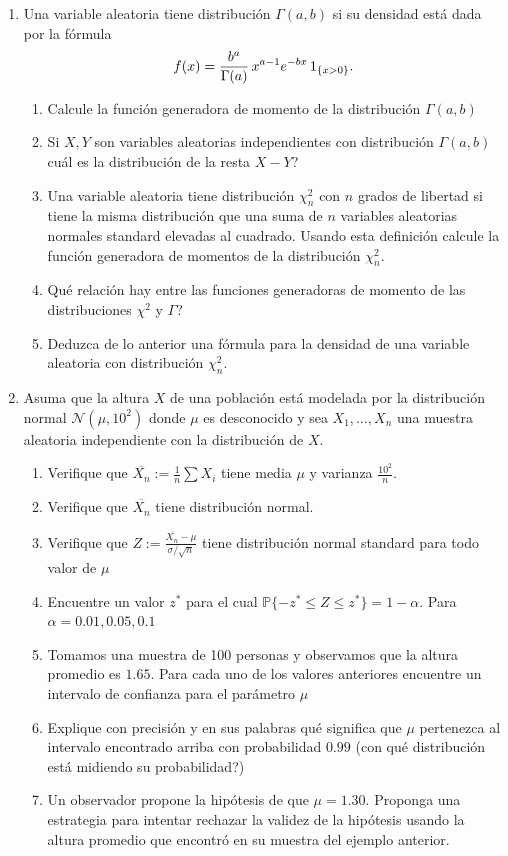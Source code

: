 \documentclass[12pt]{article}
\newcommand{\PP}{\mathbb{P}}
\begin{document}
\begin{enumerate}

    \item Una variable aleatoria tiene distribución $\Gamma(a,b)$ si su densidad est\'a dada por la f\'ormula
    \[
    f(x) = \frac{b^a}{\Gamma(a)}\, x^{a-1} e^{-bx}\,{\rm 1}_{\{x>0\}}.
    \]
    
    \begin{enumerate}
    \item Calcule la función generadora de momento de la distribución $\Gamma(a,b)$
    \item Si $X,Y$ son variables aleatorias independientes con distribución $\Gamma(a,b)$ cuál es la distribución de la resta $X-Y$?

\item Una variable aleatoria tiene distribución $\chi^2_{n}$ con $n$ grados de libertad si tiene la misma distribución que una suma de $n$ variables aleatorias normales standard elevadas al cuadrado.
Usando esta definición calcule la función generadora de momentos de la distribución $\chi^2_{n}$. 
\item  Qué relación hay entre las funciones generadoras de momento de las distribuciones $\chi^2$ y $\Gamma$?
\item Deduzca de lo anterior una fórmula para la densidad de una variable aleatoria con distribución $\chi^2_{n}$.
    \end{enumerate}




\item Asuma que la altura $X$ de una población est\'a modelada por la distribución normal 
$\mathcal{N}(\mu,10^2)$ donde $\mu$ es desconocido y sea $X_1,\dots, X_n$ una muestra 
aleatoria independiente con la distribución de $X$.
\begin{enumerate}
    \item Verifique que $\overline{X_n}:=\frac{1}{n}\sum X_i$ tiene media $\mu$ y varianza $\frac{10^2}{n}$.
    \item Verifique que $\overline{X_n}$ tiene distribución normal.
    \item Verifique que $Z:=\frac{\overline{X_n}-\mu}{\sigma/\sqrt{n}}$ tiene distribución normal standard para todo valor de $\mu$
    \item Encuentre un valor $z^*$ para el cual $\PP\{-z^*\leq Z\leq z^*\}=1-\alpha$. Para $\alpha=0.01,0.05,0.1$
    \item Tomamos una muestra de 100 personas y observamos que la altura promedio es $1.65$. Para cada uno de los valores anteriores encuentre un intervalo de confianza para el parámetro $\mu$
    \item Explique con precisión y en sus palabras qué significa que $\mu$ pertenezca al intervalo encontrado arriba con probabilidad $0.99$ (con qué distribución est\'a midiendo su probabilidad?)
    \item Un observador propone la hipótesis de que $\mu=1.30$. 
    Proponga una estrategia para intentar rechazar la validez de la hipótesis usando la altura promedio que encontr\'o en su muestra del ejemplo anterior. 
\end{enumerate}


\end{enumerate}
\end{document}
